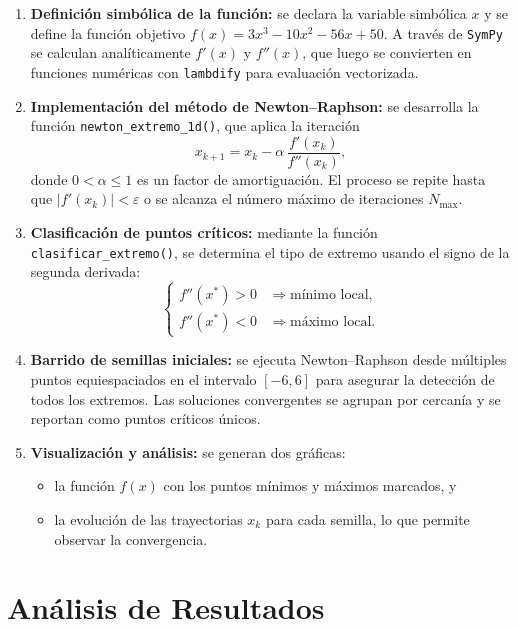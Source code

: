 \documentclass{article}
\begin{document}
\begin{enumerate}
    \item \textbf{Definición simbólica de la función:} se declara la variable simbólica \(x\) y se define la función objetivo
    \(f(x)=3x^3-10x^2-56x+50\). A través de \texttt{SymPy} se calculan analíticamente \(f'(x)\) y \(f''(x)\),
    que luego se convierten en funciones numéricas con \texttt{lambdify} para evaluación vectorizada.
    
    \item \textbf{Implementación del método de Newton--Raphson:} se desarrolla la función
    \texttt{newton\_extremo\_1d()}, que aplica la iteración
    \[
    x_{k+1}=x_k-\alpha\,\frac{f'(x_k)}{f''(x_k)},
    \]
    donde \(0<\alpha\leq1\) es un factor de amortiguación.  
    El proceso se repite hasta que \(|f'(x_k)|<\varepsilon\) o se alcanza el número máximo de iteraciones \(N_{\text{max}}\).
    
    \item \textbf{Clasificación de puntos críticos:} mediante la función \texttt{clasificar\_extremo()},
    se determina el tipo de extremo usando el signo de la segunda derivada:
    \[
    \begin{cases}
    f''(x^*)>0 & \Rightarrow \text{mínimo local},\\[4pt]
    f''(x^*)<0 & \Rightarrow \text{máximo local}.
    \end{cases}
    \]
    
    \item \textbf{Barrido de semillas iniciales:} se ejecuta Newton--Raphson desde múltiples puntos
    equiespaciados en el intervalo \([-6,6]\) para asegurar la detección de todos los extremos.
    Las soluciones convergentes se agrupan por cercanía y se reportan como puntos críticos únicos.
    
    \item \textbf{Visualización y análisis:} se generan dos gráficas:
    \begin{itemize}
        \item la función \(f(x)\) con los puntos mínimos y máximos marcados, y  
        \item la evolución de las trayectorias \(x_k\) para cada semilla, lo que permite observar la convergencia.
    \end{itemize}
\end{enumerate}



\section{Análisis de Resultados}
\end{document}
